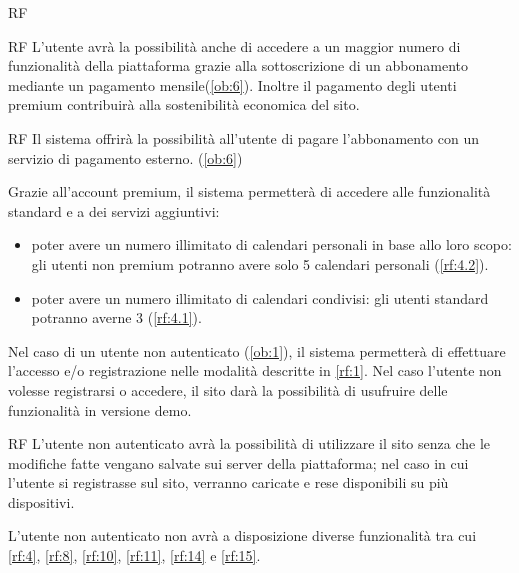 \begin{listaPersonale}{RF}
\begin{listaPersonale2}{RF}
		 L'utente avrà la possibilità anche di accedere a un maggior numero di funzionalità della piattaforma grazie alla sottoscrizione di un abbonamento mediante un pagamento mensile(\ref{ob:6}). Inoltre il pagamento degli utenti premium contribuirà alla sostenibilità economica del sito.

		\begin{listaPersonale3}{RF}
			 Il sistema offrirà la possibilità all'utente di pagare l'abbonamento con un servizio di pagamento esterno. (\ref{ob:6})

			 Grazie all'account premium, il sistema permetterà di accedere alle funzionalità standard e a dei servizi aggiuntivi:
			\begin{itemize}
				\item poter avere un numero illimitato di calendari personali in base allo loro scopo: gli utenti non premium potranno avere solo 5 calendari personali (\ref{rf:4.2}).
				\item poter avere un numero illimitato di calendari condivisi: gli utenti standard potranno averne 3 (\ref{rf:4.1}).
			\end{itemize}

		\end{listaPersonale3}
	\end{listaPersonale2}

	 Nel caso di un utente non autenticato (\ref{ob:1}), il sistema permetterà di effettuare l'accesso e/o registrazione nelle modalità descritte in \ref{rf:1}. Nel caso l'utente non volesse registrarsi o accedere, il sito darà la possibilità di usufruire delle funzionalità in versione demo.

	\begin{listaPersonale2}{RF}
			L'utente non autenticato avrà la possibilità di utilizzare il sito senza che le modifiche fatte vengano salvate sui server della piattaforma; nel caso in cui l'utente si registrasse sul sito, verranno caricate e rese disponibili su più dispositivi.

		\begin{listaPersonale3}{}
			 L'utente non autenticato non avrà a disposizione diverse funzionalità tra cui \ref{rf:4}, \ref{rf:8}, \ref{rf:10}, \ref{rf:11}, \ref{rf:14} e \ref{rf:15}.
		\end{listaPersonale3}
	\end{listaPersonale2}


\end{listaPersonale}
